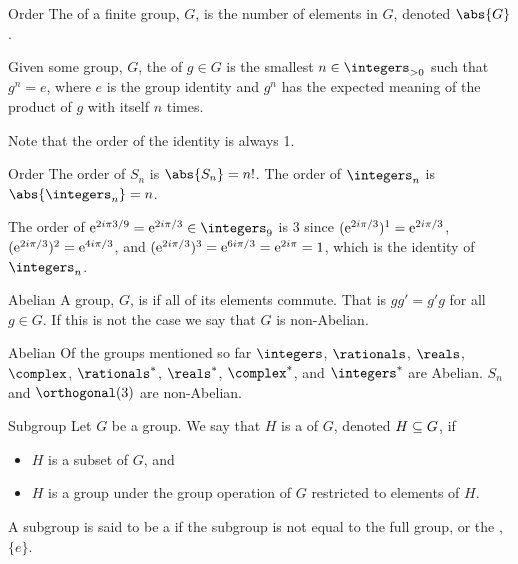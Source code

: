 \begin{dfn}{Order}{}
    The  of a finite group, \(G\), is the number of elements in \(G\), denoted \(\abs{G}\).
    
    Given some group, \(G\), the  of \(g \in G\) is the smallest \(n \in \positiveintegers\) such that \(g^n = e\), where \(e\) is the group identity and \(g^n\) has the expected meaning of the product of \(g\) with itself \(n\) times.
    
    Note that the order of the identity is always 1.
\end{dfn}

\begin{exm}{Order}{}
    The order of \(S_n\) is \(\abs{S_n} = n!\).
    The order of \(\integers_n\) is \(\abs{\integers_n} = n\).
    
    The order of \(\e^{2i\pi 3/9} = \e^{2i\pi/3} \in \integers_9\) is 3 since \((\mathrm{e}^{2i\pi/3})^1 = \mathrm{e}^{2i\pi/3}\), \((\mathrm{e}^{2i\pi/3})^2 = \mathrm{e}^{4i\pi/3}\), and \((\mathrm{e}^{2i\pi/3})^3 = \mathrm{e}^{6i\pi/3} = \mathrm{e}^{2i\pi} = 1\), which is the identity of \(\integers_n\).
\end{exm}

\begin{dfn}{Abelian}{}
    A group, \(G\), is  if all of its elements commute.
    That is \(gg' = g'g\) for all \(g \in G\).
    If this is not the case we say that \(G\) is non-Abelian.
\end{dfn}

\begin{exm}{Abelian}{}
    Of the groups mentioned so far \(\integers\), \(\rationals\), \(\reals\), \(\complex\), \(\rationals^*\), \(\reals^*\), \(\complex^*\), and \(\integers^*\) are Abelian.
    \(S_n\) and \(\orthogonal(3)\) are non-Abelian.
\end{exm}

\begin{dfn}{Subgroup}{}
    Let \(G\) be a group.
    We say that \(H\) is a  of \(G\), denoted \(H \subseteq G\), if
    \begin{itemize}
        \item \(H\) is a subset of \(G\), and
        \item \(H\) is a group under the group operation of \(G\) restricted to elements of \(H\).
    \end{itemize}
    A subgroup is said to be a  if the subgroup is not equal to the full group, or the , \(\{e\}\).
\end{dfn}

